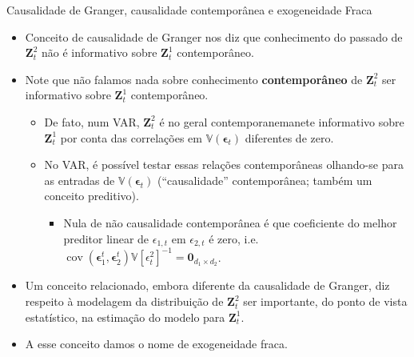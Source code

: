 \documentclass[11pt]{beamer}
\begin{document}
\begin{frame}{Causalidade de Granger, causalidade contemporânea e exogeneidade Fraca}
\begin{itemize}
	\item Conceito de causalidade de Granger nos diz que conhecimento do passado de $\boldsymbol{Z}^2_t$ não é informativo sobre $\boldsymbol{Z}^1_t$ contemporâneo.
	\item Note que não falamos nada sobre conhecimento \textbf{contemporâneo} de $\boldsymbol{Z}^2_t$ ser informativo sobre   $\boldsymbol{Z}^1_t$ contemporâneo.
	\begin{itemize}
		\item De fato, num VAR, $\boldsymbol{Z}^2_t$ é no geral contemporanemanete informativo sobre  $\boldsymbol{Z}^1_t$ por conta das correlações em $\mathbb{V}(\boldsymbol{\epsilon}_t)$ diferentes de zero.
		\item No VAR, é possível testar essas relações contemporâneas olhando-se para as entradas de $\mathbb{V}(\boldsymbol{\epsilon}_t)$ ({\color{blue}``causalidade'' contemporânea}; também um conceito preditivo). 
		\begin{itemize}
			\item 	Nula de não causalidade contemporânea é que coeficiente do melhor preditor linear de $\epsilon_{1,t}$ em $\epsilon_{2,t}$ é zero, i.e. $\operatorname{cov}(\boldsymbol{\epsilon}_1^t, \boldsymbol{\epsilon}_2^t)\mathbb{V}[\epsilon^2_t]^{-1} = \boldsymbol{0}_{d_1 \times d_2}$.
		\end{itemize}
	
	\end{itemize}
	\item Um conceito relacionado, embora diferente da causalidade de Granger, diz respeito à modelagem da distribuição de $\boldsymbol{Z}^2_t$ ser importante, do ponto de vista estatístico, na estimação do modelo para $\boldsymbol{Z}^1_t$.
	\item A esse conceito damos o nome de {\color{blue}exogeneidade fraca}.
\end{itemize}
\end{frame}
\end{document}
